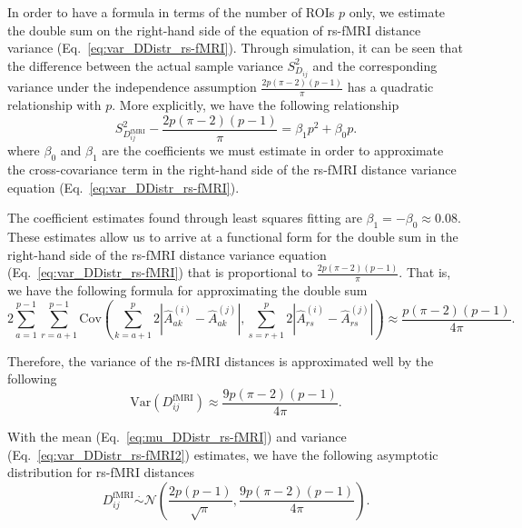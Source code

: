 \documentclass[10pt,letterpaper]{article}
\begin{document}
In order to have a formula in terms of the number of ROIs $p$ only, we estimate the double sum on the right-hand side of the equation of rs-fMRI distance variance (Eq.~\ref{eq:var_DDistr_rs-fMRI}). Through simulation, it can be seen that the difference between the actual sample variance $S^2_{D_{ij}}$ and the corresponding variance under the independence assumption $\frac{2p(\pi-2)(p-1)}{\pi}$ has a quadratic relationship with $p$. More explicitly, we have the following relationship
%
\begin{equation}\label{eq:estimate_cov}
S^2_{D^\text{fMRI}_{ij}} - \frac{2p(\pi-2)(p-1)}{\pi} = \beta_1 p^2 + \beta_0 p.
\end{equation}
%
where $\beta_0$ and $\beta_1$ are the coefficients we must estimate in order to approximate the cross-covariance term in the right-hand side of the rs-fMRI distance variance equation (Eq.~\ref{eq:var_DDistr_rs-fMRI}).

The coefficient estimates found through least squares fitting are $\beta_1 = - \beta_0 \approx 0.08$. These estimates allow us to arrive at a functional form for the double sum in the right-hand side of the rs-fMRI distance variance equation (Eq.~\ref{eq:var_DDistr_rs-fMRI}) that is proportional to $\frac{2p(\pi-2)(p-1)}{\pi}$. That is, we have the following formula for approximating the double sum
%
\begin{equation}\label{eq:estimate_cov_form}
2\sum_{a = 1}^{p-1} \sum_{r=a+1}^{p-1} \text{Cov}\left(\sum_{k=a+1}^{p} 2\left|\hat{A}^{(i)}_{ak} - \hat{A}^{(j)}_{ak}\right|, \sum_{s=r+1}^{p} 2\left|\hat{A}^{(i)}_{rs} - \hat{A}^{(j)}_{rs}\right|\right) \approx \frac{p(\pi - 2)(p - 1)}{4\pi}.
\end{equation}

Therefore, the variance of the rs-fMRI distances is approximated well by the following
%
\begin{equation}\label{eq:var_DDistr_rs-fMRI2}
\text{Var}(D^\text{fMRI}_{ij}) \approx \frac{9p(\pi - 2)(p-1)}{4\pi}.
\end{equation}

With the mean (Eq.~\ref{eq:mu_DDistr_rs-fMRI}) and variance (Eq.~\ref{eq:var_DDistr_rs-fMRI2}) estimates, we have the following asymptotic distribution for rs-fMRI distances
%
\begin{equation}\label{eq:DDistr_rs-fMRI}
D^\text{fMRI}_{ij} \overset{.}{\sim} \mathcal{N}\left(\frac{2p(p-1)}{\sqrt{\pi}}, \frac{9p(\pi - 2)(p-1)}{4\pi}\right).
\end{equation}
\end{document}
